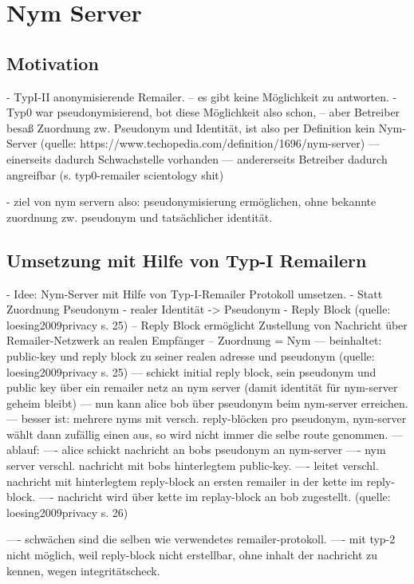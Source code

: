 \chapter{Nym Server}

\section{Motivation}
- TypI-II anonymisierende Remailer.
-- es gibt keine Möglichkeit zu antworten.
- Typ0 war pseudonymisierend, bot diese Möglichkeit also schon,
-- aber Betreiber besaß Zuordnung zw. Pseudonym und Identität, ist also per Definition kein Nym-Server (quelle: https://www.techopedia.com/definition/1696/nym-server)
--- einerseits dadurch Schwachstelle vorhanden
--- andererseits Betreiber dadurch angreifbar (s. typ0-remailer scientology shit)

- ziel von nym servern also: pseudonymisierung ermöglichen, ohne bekannte zuordnung zw. pseudonym und tatsächlicher identität.

\section{Umsetzung mit Hilfe von Typ-I Remailern}
- Idee: Nym-Server mit Hilfe von Typ-I-Remailer Protokoll umsetzen.
- Statt Zuordnung Pseudonym - realer Identität -> Pseudonym - Reply Block (quelle: loesing2009privacy s. 25)
-- Reply Block ermöglicht Zustellung von Nachricht über Remailer-Netzwerk an realen Empfänger
-- Zuordnung = Nym
--- beinhaltet: public-key und reply block zu seiner realen adresse und pseudonym (quelle: loesing2009privacy s. 25)
--- schickt initial reply block, sein pseudonym und public key über ein remailer netz an nym server (damit identität für nym-server geheim bleibt)
--- nun kann alice bob über pseudonym beim nym-server erreichen.
--- besser ist: mehrere nyms mit versch. reply-blöcken pro pseudonym, nym-server wählt dann zufällig einen aus, so wird nicht immer die selbe route genommen.
--- ablauf:
---- alice schickt nachricht an bobs pseudonym an nym-server
---- nym server verschl. nachricht mit bobs hinterlegtem public-key.
---- leitet verschl. nachricht mit hinterlegtem reply-block an ersten remailer in der kette im reply-block.
---- nachricht wird über kette im replay-block an bob zugestellt. (quelle: loesing2009privacy s. 26)

---- schwächen sind die selben wie verwendetes remailer-protokoll.
---- mit typ-2 nicht möglich, weil reply-block nicht erstellbar, ohne inhalt der nachricht zu kennen, wegen integritätscheck.